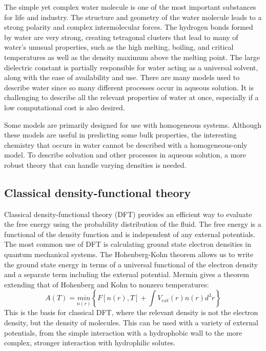 \documentclass[letterpaper,twocolumn,amsmath,amssymb,prb]{revtex4-1}
\begin{document}
The simple yet complex water molecule is one of the most important 
substances for life and industry. The structure and geometry of the 
water molecule leads to a strong polarity and complex intermolecular
forces. The hydrogen bonds formed by water are very strong, creating
tetragonal clusters that lead to many of water's unusual properties,
such as the high melting, boiling, and critical temperatures as well as the
density maximum above the melting point.
The large dielectric constant is partially responsible for
water acting as a universal solvent, along with the ease of availability and
use.
There are many models used to describe water since so many different
processes occur in aqueous solution. It is challenging to describe all the 
relevant properties of water at once, especially if a low computational cost is
also desired.

Some models are primarily designed for use with homogeneous systems. Although
these 
models are useful in predicting some bulk properties, the interesting
chemistry that occurs in water cannot be described with a homogeneous-only
model. To
describe solvation and other processes in aqueous solution, a more robust theory
that 
can handle varying densities is needed.

\subsection{Classical density-functional theory}

Classical density-functional theory (DFT) provides an efficient way to evaluate
the free energy using the probability distribution of the fluid. The free energy 
is a functional
of the density function and is independent of any external
potentials\cite{ebner1976density}. The most common use of DFT is calculating ground
state electron densities in quantum mechanical systems. The Hohenberg-Kohn
theorem\cite{hohenberg1964inhomogeneous} allows us to write the ground state
energy in terms of a universal functional of the electron density and a separate
term including the external potential. Mermin\cite{mermin1965thermal} gives a
theorem extending that of Hohenberg and Kohn to nonzero temperatures:
\begin{equation}
  A(T) = \underset{n(r)}{min}\left\{ F[n(r),T] + \int V_{ext}(r) n(r)
d^3r\right\}
\end{equation}
This is the basis for classical DFT, where the relevant density is not the
electron density,
but the density of molecules. This can be used with a variety of 
external potentials, from the simple interaction with a 
hydrophobic wall to the more complex, stronger interaction with hydrophilic
solutes.
\end{document}
